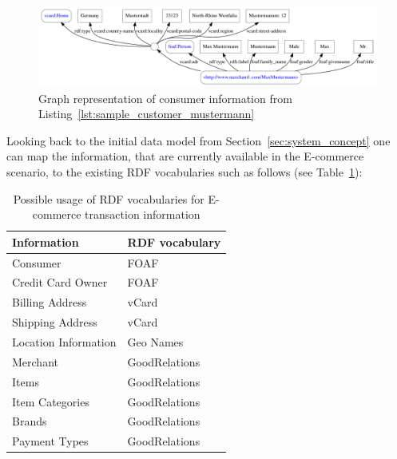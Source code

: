 
\begin{figure}[H]
	\centering
		\includegraphics[width=\columnwidth]{images/sample_customer_mustermann.pdf}
	\caption{Graph representation of consumer information from Listing~\ref{lst:sample_customer_mustermann}}
\label{fig:images_sample_customer}
\end{figure}

Looking back to the initial data model from Section~\ref{sec:system_concept} one can map the information, that are currently available in the \gls{E-commerce} scenario, to the existing \gls{RDF} vocabularies such as follows (see Table~\ref{tab:map_tx_rdf_vocab}):\@

\begin{table}[]
\centering
\begin{tabular}{p{5cm}l}
\hline
\textbf{Information} & \textbf{RDF vocabulary} \\
\hline
Consumer & FOAF \\
\hline
Credit Card Owner & FOAF \\
\hline
Billing Address & vCard \\
\hline
Shipping Address & vCard \\
\hline
Location Information & Geo Names \\
\hline
Merchant & GoodRelations \\
\hline
Items & GoodRelations \\
\hline
Item Categories & GoodRelations \\
\hline
Brands & GoodRelations \\
\hline
Payment Types & GoodRelations \\
\hline
\end{tabular}
\caption{Possible usage of \gls{RDF} vocabularies for \gls{E-commerce} transaction information}
\label{tab:map_tx_rdf_vocab}
\end{table}


